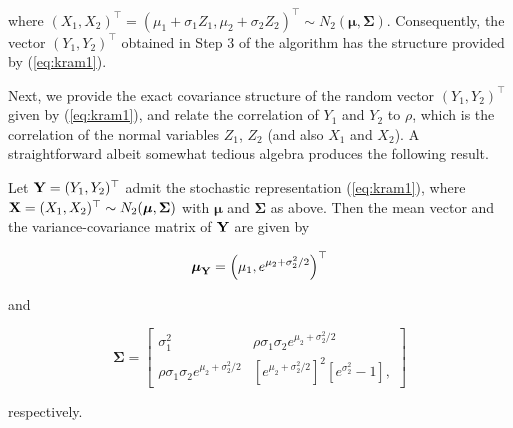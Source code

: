 \documentclass[
]{jss}
\begin{document}
where
\((X_1, X_2)^\top = (\mu_1+\sigma_1 Z_1, \mu_2+\sigma_2 Z_2)^\top \sim N_2(\boldsymbol \mu, \boldsymbol \Sigma)\).
Consequently, the vector \((Y_1, Y_2)^\top\) obtained in Step 3 of the
algorithm has the structure provided by (\ref{eq:kram1}).

\vspace{0.1in}

\noindent Next, we provide the exact covariance structure of the random
vector \((Y_1, Y_2)^\top\) given by (\ref{eq:kram1}), and relate the
correlation of \(Y_1\) and \(Y_2\) to \(\rho\), which is the correlation
of the normal variables \(Z_1\), \(Z_2\) (and also \(X_1\) and \(X_2\)).
A straightforward albeit somewhat tedious algebra produces the following
result.

\begin{lemma}
Let ${\bf Y} = (Y_1, Y_2)^\top$ admit the stochastic representation (\ref{eq:kram1}), where ${\bf X} = (X_1, X_2)^\top \sim N_2(\boldsymbol \mu, \boldsymbol \Sigma)$ with $\boldsymbol \mu$ and $\boldsymbol \Sigma$ as above. Then the mean vector and the variance-covariance matrix of ${\bf Y}$ are given by 

\begin{equation}
\label{eq:kram6}
\boldsymbol \mu_{{\bf Y}} = \left(\mu_1, e^{\mu_2+\sigma_2^2/2}\right)^\top
\end{equation}

and 

\begin{equation}
\label{eq:kram7}
\boldsymbol \Sigma = 
\begin{bmatrix}
\sigma_1^2 & \rho \sigma_1\sigma_2  e^{\mu_2+\sigma_2^2/2}  \\
\rho \sigma_1\sigma_2 e^{\mu_2+\sigma_2^2/2} & \left[ e^{\mu_2+\sigma_2^2/2}\right]^2 \left[e^{\sigma_2^2} -1 \right],
\end{bmatrix}
\end{equation}

respectively. 
\end{lemma}
\end{document}
